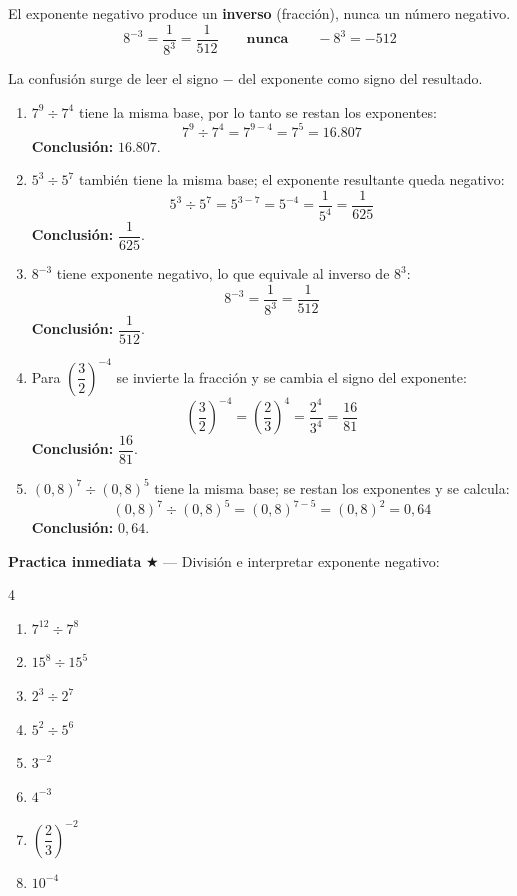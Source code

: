 \documentclass[11pt, letterpaper]{article}
\begin{document}
\begin{tcolorbox}[warningbox, title={Error frecuente — $a^{-n} \neq -a^n$}]
El exponente negativo produce un \textbf{inverso} (fracción), nunca un número negativo.
$$8^{-3} = \frac{1}{8^3} = \frac{1}{512} \qquad \textbf{nunca} \qquad -8^3 = -512$$

La confusión surge de leer el signo $-$ del exponente como signo del resultado.
\end{tcolorbox}

\begin{tcolorbox}[examplebox, title={Ejemplos — P2 y exponente negativo}]
\begin{enumerate}[label=\textbf{Ej. \arabic*.}, leftmargin=*, itemsep=14pt]

\item $7^9 \div 7^4$ tiene la misma base, por lo tanto se restan los exponentes:
$$7^9 \div 7^4 = 7^{9-4} = 7^5 = 16.807$$
\textbf{Conclusión:} $16.807$.

\item $5^3 \div 5^7$ también tiene la misma base; el exponente resultante queda negativo:
$$5^3 \div 5^7 = 5^{3-7} = 5^{-4} = \frac{1}{5^4} = \frac{1}{625}$$
\textbf{Conclusión:} $\dfrac{1}{625}$.

\item $8^{-3}$ tiene exponente negativo, lo que equivale al inverso de $8^3$:
$$8^{-3} = \frac{1}{8^3} = \frac{1}{512}$$
\textbf{Conclusión:} $\dfrac{1}{512}$.

\item Para $\left(\dfrac{3}{2}\right)^{-4}$ se invierte la fracción y se cambia el signo del exponente:
$$\left(\frac{3}{2}\right)^{-4} = \left(\frac{2}{3}\right)^4 = \frac{2^4}{3^4} = \frac{16}{81}$$
\textbf{Conclusión:} $\dfrac{16}{81}$.

\item $(0{,}8)^7 \div (0{,}8)^5$ tiene la misma base; se restan los exponentes y se calcula:
$$(0{,}8)^7 \div (0{,}8)^5 = (0{,}8)^{7-5} = (0{,}8)^2 = 0{,}64$$
\textbf{Conclusión:} $0{,}64$.
\end{enumerate}
\end{tcolorbox}

\medskip
\textbf{Practica inmediata} \quad $\bigstar$ — División e interpretar exponente negativo:
\begin{multicols}{4}
\begin{enumerate}[label=\alph*), leftmargin=*]
  \item $7^{12} \div 7^8$
  \item $15^8 \div 15^5$
  \item $2^3 \div 2^7$
  \item $5^2 \div 5^6$
  \item $3^{-2}$
  \item $4^{-3}$
  \item $\left(\dfrac{2}{3}\right)^{-2}$
  \item $10^{-4}$
\end{enumerate}
\end{multicols}
\end{document}
